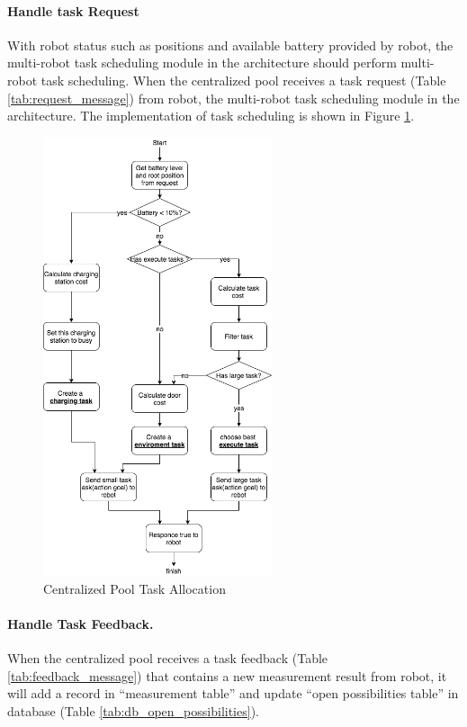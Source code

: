 \paragraph{Handle task Request}
With robot status such as positions and available battery provided by robot, the multi-robot task scheduling module in the architecture should perform multi-robot task scheduling. 
When the centralized pool receives a task request (Table \ref{tab:request_message}) from robot,  the multi-robot task scheduling module in the architecture. The implementation of task scheduling is shown in Figure \ref{fig:centralized_task_scheduling}. 

\begin{figure}[htbp]
    \centering
    \includegraphics[width = 0.6\textwidth]{content/images/ch4/centralized_task_select.drawio.png}
    \caption{Centralized Pool Task Allocation}
    \label{fig:centralized_task_scheduling}
\end{figure}

\paragraph{Handle Task Feedback.}
When the centralized pool receives a task feedback (Table \ref{tab:feedback_message}) that contains a new measurement result from robot, it will add a record in ``measurement table'' and update ``open possibilities table'' in database (Table \ref{tab:db_open_possibilities}).

